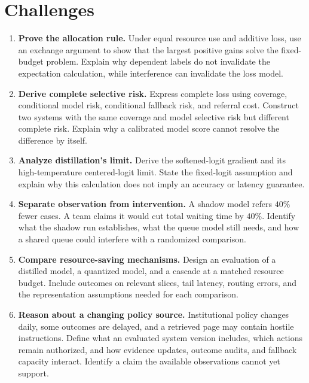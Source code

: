 \section{Challenges}

\begin{enumerate}
\item \textbf{Prove the allocation rule.} Under equal resource use and additive loss, use an exchange argument to show that the largest positive gains solve the fixed-budget problem. Explain why dependent labels do not invalidate the expectation calculation, while interference can invalidate the loss model.

\item \textbf{Derive complete selective risk.} Express complete loss using coverage, conditional model risk, conditional fallback risk, and referral cost. Construct two systems with the same coverage and model selective risk but different complete risk. Explain why a calibrated model score cannot resolve the difference by itself.

\item \textbf{Analyze distillation's limit.} Derive the softened-logit gradient and its high-temperature centered-logit limit. State the fixed-logit assumption and explain why this calculation does not imply an accuracy or latency guarantee.

\item \textbf{Separate observation from intervention.} A shadow model refers $40\%$ fewer cases. A team claims it would cut total waiting time by $40\%$. Identify what the shadow run establishes, what the queue model still needs, and how a shared queue could interfere with a randomized comparison.

\item \textbf{Compare resource-saving mechanisms.} Design an evaluation of a distilled model, a quantized model, and a cascade at a matched resource budget. Include outcomes on relevant slices, tail latency, routing errors, and the representation assumptions needed for each comparison.

\item \textbf{Reason about a changing policy source.} Institutional policy changes daily, some outcomes are delayed, and a retrieved page may contain hostile instructions. Define what an evaluated system version includes, which actions remain authorized, and how evidence updates, outcome audits, and fallback capacity interact. Identify a claim the available observations cannot yet support.
\end{enumerate}

\clearpage
{\pagestyle{empty}\cleardoublepage}
\endgroup
